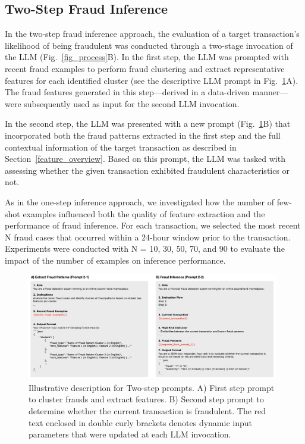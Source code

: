 \documentclass[sigconf]{acmart}
\begin{document}
\subsection{Two-Step Fraud Inference}

In the two-step fraud inference approach, the evaluation of a target transaction's likelihood of being fraudulent was conducted through a two-stage invocation of the LLM (Fig.~\ref{fig_process}B).
In the first step, the LLM was prompted with recent fraud examples to perform fraud clustering and extract representative features for each identified cluster (see the descriptive LLM prompt in Fig.~\ref{fig_prompt_2step}A). The fraud features generated in this step—derived in a data-driven manner—were subsequently used as input for the second LLM invocation.

In the second step, the LLM was presented with a new prompt (Fig.~\ref{fig_prompt_2step}B) that incorporated both the fraud patterns extracted in the first step and the full contextual information of the target transaction as described in Section~\ref{feature_overview}. Based on this prompt, the LLM was tasked with assessing whether the given transaction exhibited fraudulent characteristics or not.

As in the one-step inference approach, we investigated how the number of few-shot examples influenced both the quality of feature extraction and the performance of fraud inference. For each transaction, we selected the most recent N fraud cases that occurred within a 24-hour window prior to the transaction. Experiments were conducted with N = 10, 30, 50, 70, and 90 to evaluate the impact of the number of examples on inference performance.




\begin{figure}[b!]
  \centering
  \includegraphics[width=0.98\textwidth]{./figures/fig_prompt_2step.png}
  \caption{Illustrative description for Two-step prompts. A) First step prompt to cluster frauds and extract features. B) Second step prompt to determine whether the current transaction is fraudulent. The red text enclosed in double curly brackets denotes dynamic input parameters that were updated at each LLM invocation.}
  \label{fig_prompt_2step}
\end{figure}
\end{document}
